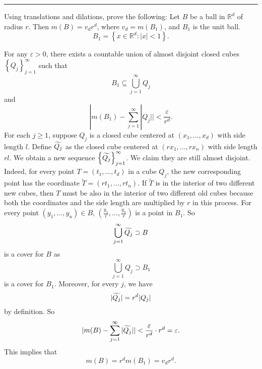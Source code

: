 \documentclass[letterpaper, 12pt]{article}
\begin{document}
\noindent\rule{7in}{2.8pt}
\begin{problem}{1.6}
Using translations and dilations, prove the following: Let \(B\) be a ball in \(\mathbb{R}^d\) of radius \(r\). Then \(m(B)=v_d r^d\), where \(v_d=m(B_1)\), and \(B_1\) is the unit ball. 
\[B_1=\left\{ x\in \mathbb{R}^d: |x|<1 \right\}.\]
\end{problem}
\begin{solution}
For any \(\varepsilon>0\), there exists a countable union of almost disjoint closed cubes \(\left\{ Q_j \right\}_{j=1}^\infty\) such that 
\[B_1\subseteq \bigcup_{j=1}^\infty Q_j\] 
and 
\[|m(B_1)-\sum_{j=1}^{\infty}|Q_j||<\frac{\varepsilon}{r^d}.\] 
For each \(j\geq 1\), suppose \(Q_j\) is a closed cube centered at \((x_1,\ldots,x_d)\) with side length \(l\). Define \(\widetilde{Q_j}\) as the closed cube centered at \((rx_1,\ldots,rx_n)\) with side length \(rl\). We obtain a new sequence \(\left\{ \widetilde{Q_j} \right\}_{j=1}^\infty\). We claim they are still almost disjoint. Indeed, for every point \(T=(t_1,\ldots,t_d)\) in a cube \(Q_j\), the new corresponding point has the coordinate \(\tilde{T}=(rt_1,\ldots,rt_n)\). If \(\tilde{T}\) is in the interior of two different new cubes, then \(T\) must be also in the interior of two different old cubes because both the coordinates and the side length are multiplied by \(r\) in this process. For every point \((y_1,\ldots,y_n)\in B\), \((\frac{y_1}{r},\ldots,\frac{y_n}{r})\) is a point in \(B_1\). So 
\[\bigcup_{j=1}^\infty \widetilde{Q_j}\supset B\] 
is a cover for \(B\) as 
\[\bigcup_{j=1}^\infty Q_j\supset B_1\] 
is a cover for \(B_1\). Moreover, for every \(j\), we have  
\[|\widetilde{Q_j}|=r^d|Q_j|\]
by definition. So 
\[|m(B)-\sum_{j=1}^{\infty}|\widetilde{Q_j}||<\frac{\varepsilon}{r^d}\cdot r^d=\varepsilon.\]
This implies that 
\[m(B)=r^dm(B_1)=v_d r^d.\]
\end{solution}
\end{document}
